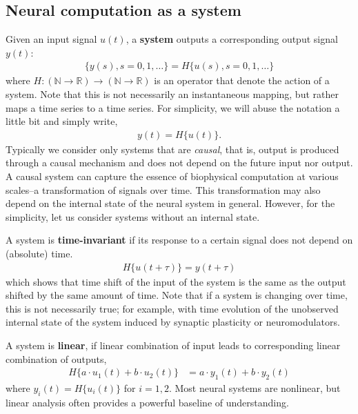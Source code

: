 \documentclass[a4paper,11pt]{exam}
\newcounter{ct}
\newcommand{\field}[1]{\ensuremath{\mathbb{#1}}}
\newcommand{\reals}{\field{R}}
\newcommand{\naturalNumbers}{\field{N}}
\begin{document}
\begin{questions}
\subsection{Neural computation as a system}
Given an input signal $u(t)$, a \textbf{system} outputs a corresponding output signal $y(t)$:
\begin{align}
    \{y(s), s = 0, 1, \ldots\} = H\{u(s), s = 0, 1, \ldots\}
\end{align}
where $H: (\naturalNumbers \to \reals) \to (\naturalNumbers \to \reals)$ is an operator that denote the action of a system.
Note that this is not necessarily an instantaneous mapping, but rather maps a time series to a time series.
For simplicity, we will abuse the notation a little bit and simply write,
\begin{align}
    y(t) = H\{u(t)\}.
\end{align}
Typically we consider only systems that are \emph{causal}, that is, output is produced through a causal mechanism and does not depend on the future input nor output.
A causal system can capture the essence of biophysical computation at various scales--a transformation of signals over time.
This transformation may also depend on the internal state of the neural system in general.
However, for the simplicity, let us consider systems without an internal state.

A system is \textbf{time-invariant} if its response to a certain signal does not depend on (absolute) time.
\begin{align}\label{eq:lti:invariant}
    H\{u(t + \tau)\} = y(t + \tau)
\end{align}
which shows that time shift of the input of the system is the same as the output shifted by the same amount of time.
Note that if a system is changing over time, this is not necessarily true; for example, with time evolution of the unobserved internal state of the system induced by synaptic plasticity or neuromodulators.

A system is \textbf{linear}, if linear combination of input leads to corresponding linear combination of outputs,
\begin{align}
    H\{a \cdot u_1(t) + b \cdot u_2(t)\} &= a \cdot y_1(t) + b \cdot y_2(t)
\end{align}
where $y_i(t) = H\{u_i(t)\}$ for $i = 1, 2$.
Most neural systems are nonlinear, but linear analysis often provides a powerful baseline of understanding.


\end{questions}
\end{document}
